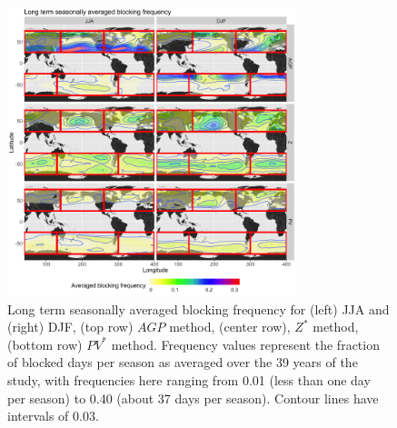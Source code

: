 \documentclass[smallextended]{svjour3}       %
\numberwithin{equation}{section}
\begin{document}
\begin{figure}
\centering
\includegraphics[width=0.75\textwidth]{fig6}
\caption{Long term seasonally averaged blocking frequency for (left) JJA and (right) DJF, (top row) $AGP$ method, (center row), $Z^*$ method, (bottom row) $PV^*$ method. Frequency values represent the fraction of blocked days per season as averaged over the 39 years of the study, with frequencies here ranging from 0.01 (less than one day per season) to 0.40 (about 37 days per season). Contour lines have intervals of 0.03.}\label{blockdens} 
\end{figure}
\end{document}
